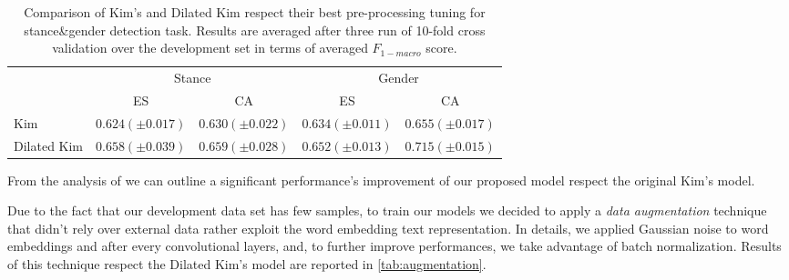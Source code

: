 \begin{table}[h]
	\centering
	\caption{Comparison of Kim's and Dilated Kim respect their best pre-processing tuning for stance\&gender detection task. Results are averaged after three run of 10-fold cross validation over the development set in terms of averaged $F_{1-macro}$ score.}
	\label{tab:dilation}
	\begin{tabular}{l|cc|cc}
		\hline\noalign{\smallskip}
		\multirow{2}{*}{Models}		& \multicolumn{2}{c|}{Stance}	& \multicolumn{2}{c}{Gender}\\
		\cline{2-5}
		& ES		& CA		& ES		& CA		\\
		\noalign{\smallskip}
		\hline
		\noalign{\smallskip}
		Kim							& $0.624 (\pm0.017)$ & $0.630 (\pm0.022)$ & $0.634 (\pm0.011)$ & $0.655 (\pm0.017)$	\\
		Dilated Kim					& $0.658 (\pm0.039)$ & $0.659 (\pm0.028)$ & $0.652 (\pm0.013)$ & $0.715 (\pm0.015)$	\\
		\hline
	\end{tabular}
\end{table}


From the analysis of  we can outline a significant performance's improvement of our proposed model respect the original Kim's model.


Due to the fact that our development data set has few samples, to train our models we decided to apply a \emph{data augmentation} technique that didn't rely over external data rather exploit the word embedding text representation. In details, we applied Gaussian noise to word embeddings and after every convolutional layers, and, to further improve performances, we take advantage of batch normalization.
Results of this technique respect the Dilated Kim's model are reported in \cref{tab:augmentation}.

\begin{comment}
\begin{table}[h]
\footnotesize
\caption{Data augmentation study for Dilated Kim's model over the Spanish stance detection development dataset. Results are averaged after three run of 10-fold cross validation over the development set in terms of averaged $F_{1-macro}$ score. }
\label{tab:augmentationOLD}
\centering
\begin{tabular}{c|ccc}
\toprule
\hline
System		& Nothing	& Gaussian noise	& Batch normalization	\\
\hline
Dilated Kim	& 0.658 ($\pm$ 0.039) & 0.664 ($\pm$ 0.043)	& 0.675 ($\pm$ 0.049)	\\
\hline
\bottomrule
\end{tabular}
\end{table}
\end{comment}


